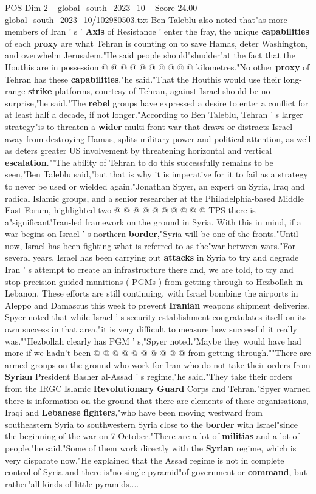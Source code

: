 \begin{textsample}{POS Dim 2 – global\_south\_2023\_10 – Score 24.00 – global\_south\_2023\_10/102980503.txt}
Ben Taleblu also noted that"as more members of Iran ' s ' \textbf{Axis} of Resistance ' enter the fray, the unique \textbf{capabilities} of each \textbf{proxy} are what Tehran is counting on to save Hamas, deter Washington, and overwhelm Jerusalem."He said people should"shudder"at the fact that the Houthis are in possession @ @ @ @ @ @ @ @ @ @ kilometres."No other \textbf{proxy} of Tehran has these \textbf{capabilities},"he said."That the Houthis would use their long-range \textbf{strike} platforms, courtesy of Tehran, against Israel should be no surprise,"he said."The \textbf{rebel} groups have expressed a desire to enter a conflict for at least half a decade, if not longer."According to Ben Taleblu, Tehran ' s larger strategy"is to threaten a \textbf{wider} multi-front war that draws or distracts Israel away from destroying Hamas, splits military power and political attention, as well as deters greater US involvement by threatening horizontal and vertical \textbf{escalation}.""The ability of Tehran to do this successfully remains to be seen,"Ben Taleblu said,"but that is why it is imperative for it to fail as a strategy to never be used or wielded again."Jonathan Spyer, an expert on Syria, Iraq and radical Islamic groups, and a senior researcher at the Philadelphia-based Middle East Forum, highlighted two @ @ @ @ @ @ @ @ @ @ TPS there is a"significant"Iran-led framework on the ground in Syria.
With this in mind, if a war begins on Israel ' s northern \textbf{border},"Syria will be one of the fronts."Until now, Israel has been fighting what is referred to as the"war between wars."For several years, Israel has been carrying out \textbf{attacks} in Syria to try and degrade Iran ' s attempt to create an infrastructure there and, we are told, to try and stop precision-guided munitions ( PGMs ) from getting through to Hezbollah in Lebanon.
These efforts are still continuing, with Israel bombing the airports in Aleppo and Damascus this week to prevent \textbf{Iranian} weapons shipment deliveries.
Spyer noted that while Israel ' s security establishment congratulates itself on its own success in that area,"it is very difficult to measure how successful it really was.""Hezbollah clearly has PGM ' s,"Spyer noted."Maybe they would have had more if we hadn't been @ @ @ @ @ @ @ @ @ @ from getting through.""There are armed groups on the ground who work for Iran who do not take their orders from \textbf{Syrian} President Basher al-Assad ' s regime,"he said."They take their orders from the IRGC Islamic \textbf{Revolutionary} \textbf{Guard} Corps and Tehran."Spyer warned there is information on the ground that there are elements of these organisations, Iraqi and \textbf{Lebanese} \textbf{fighters},"who have been moving westward from southeastern Syria to southwestern Syria close to the \textbf{border} with Israel"since the beginning of the war on 7 October."There are a lot of \textbf{militias} and a lot of people,"he said."Some of them work directly with the \textbf{Syrian} regime, which is very disparate now."He explained that the Assad regime is not in complete control of Syria and there is"no single pyramid"of government or \textbf{command}, but rather"all kinds of little pyramids....

\end{textsample}
